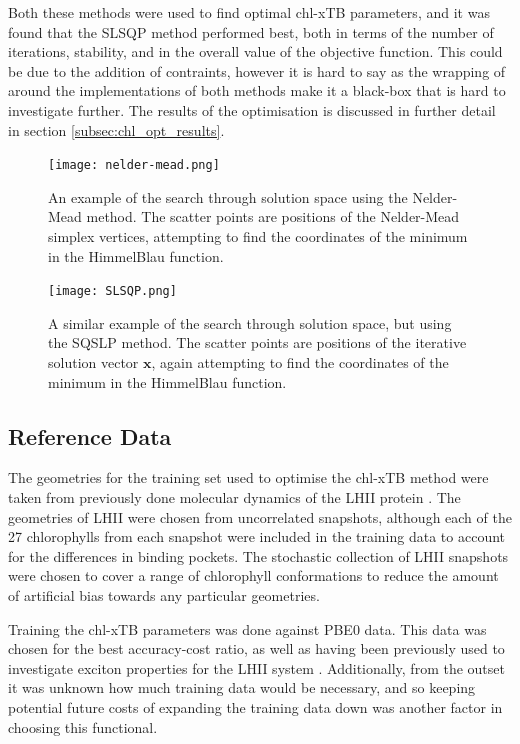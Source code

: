Both these methods were used to find optimal chl-xTB parameters, and it was found 
that the SLSQP method performed best, both in terms of the number of iterations,
stability, and in the overall value of the objective function. This could be due 
to the addition of contraints, however it is hard to say as the wrapping of 
around the implementations of both methods make it a black-box that is hard to 
investigate further. The results of the optimisation is discussed in further detail
in section \ref{subsec:chl_opt_results}.

\begin{figure}
    \texttt{[image: nelder-mead.png]}
    \label{fig:nelder_mead}
    \caption{An example of the search through solution space using the Nelder-Mead
    method. The scatter points are positions of the Nelder-Mead simplex vertices,
    attempting to find the coordinates of the minimum in the HimmelBlau function.}
\end{figure}

\begin{figure}
    \texttt{[image: SLSQP.png]}
    \label{fig:slsqp}
    \caption{A similar example of the search through solution space, but using the
    SQSLP method. The scatter points are positions of the iterative solution vector
    $\mathbf{x}$, again attempting to find the coordinates of the minimum in the 
    HimmelBlau function.}
\end{figure}

\subsection{Reference Data}
\label{subsec:ref_data}
The geometries for the training set used to optimise the chl-xTB method were taken
from previously done molecular dynamics of the LHII protein \cite{Stross2016}. 
The geometries of LHII were chosen from uncorrelated snapshots, although each of
the 27 chlorophylls from each snapshot were included in the training data to account
for the differences in binding pockets. The stochastic collection of LHII snapshots
were chosen to cover a range of chlorophyll conformations to reduce the amount of
artificial bias towards any particular geometries.

Training the chl-xTB parameters was done against PBE0 data. This data was chosen
for the best accuracy-cost ratio, as well as having been previously used to investigate
exciton properties for the LHII system \cite{Stross2016}. Additionally, from the
outset it was unknown how much training data would be necessary, and so keeping 
potential future costs of expanding the training data down was another factor in 
choosing this functional.

